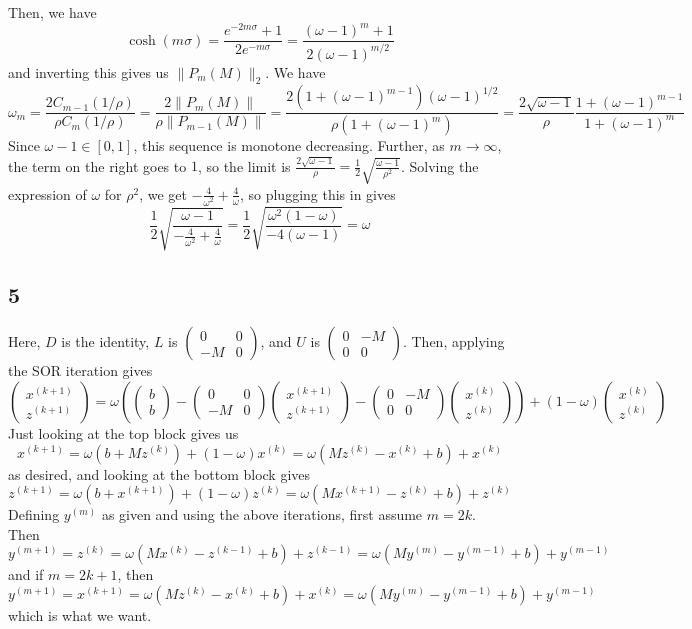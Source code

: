 \documentclass{article}
\newcommand{\openm}{\begin{pmatrix}}
\newcommand{\closem}{\end{pmatrix}}
\begin{document}
Then, we have
\[\cosh(m\sigma)=\frac{e^{-2m\sigma}+1}{2e^{-m\sigma}}=\frac{(\omega-1)^m+1}{2(\omega-1)^{m/2}}\]
and inverting this gives us $\|P_m(M)\|_2$.
We have
\[\omega_m=\frac{2C_{m-1}(1/\rho)}{\rho C_{m}(1/\rho)}=\frac{2\|P_m(M)\|}{\rho\|P_{m-1}(M)\|}=\frac{2(1+(\omega-1)^{m-1})(\omega-1)^{1/2}}{\rho(1+(\omega-1)^m)}=\frac{2\sqrt{\omega-1}}{\rho}\frac{1+(\omega-1)^{m-1}}{1+(\omega-1)^m}\]
Since $\omega-1\in[0,1]$, this sequence is monotone decreasing. Further, as $m\to\infty$, the term on the right goes to $1$, so the limit is $\frac{2\sqrt{\omega-1}}{\rho}=\frac{1}{2}\sqrt{\frac{\omega-1}{\rho^2}}$. Solving the expression of $\omega$ for $\rho^2$, we get $-\frac{4}{\omega^2}+\frac{4}{\omega}$, so plugging this in gives
\[\frac{1}{2}\sqrt{\frac{\omega-1}{-\frac{4}{\omega^2}+\frac{4}{\omega}}}=\frac{1}{2}\sqrt{\frac{\omega^2(1-\omega)}{-4(\omega-1)}}=\omega\]
\subsection*{5}
Here, $D$ is the identity, $L$ is $\openm0&0\\-M&0\closem$, and $U$ is $\openm0&-M\\0&0\closem$. Then, applying the SOR iteration gives
\[\openm x^{(k+1)}\\z^{(k+1)}\closem=\omega\left(\openm b\\b\closem-\openm0&0\\-M&0\closem\openm x^{(k+1)}\\z^{(k+1)}\closem-\openm0&-M\\0&0\closem\openm x^{(k)}\\z^{(k)}\closem\right)+(1-\omega)\openm x^{(k)}\\z^{(k)}\closem\]
Just looking at the top block gives us
\[x^{(k+1)}=\omega(b+Mz^{(k)})+(1-\omega)x^{(k)}=\omega(Mz^{(k)}-x^{(k)}+b)+x^{(k)}\]
as desired, and looking at the bottom block gives
\[z^{(k+1)}=\omega(b+x^{(k+1)})+(1-\omega)z^{(k)}=\omega(Mx^{(k+1)}-z^{(k)}+b)+z^{(k)}\]
Defining $y^{(m)}$ as given and using the above iterations, first assume $m=2k$. Then
\[y^{(m+1)}=z^{(k)}=\omega(Mx^{(k)}-z^{(k-1)}+b)+z^{(k-1)}=\omega(My^{(m)}-y^{(m-1)}+b)+y^{(m-1)}\]
and if $m=2k+1$, then
\[y^{(m+1)}=x^{(k+1)}=\omega(Mz^{(k)}-x^{(k)}+b)+x^{(k)}=\omega(My^{(m)}-y^{(m-1)}+b)+y^{(m-1)}\]
which is what we want.
\end{document}
